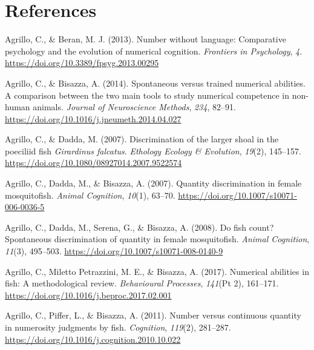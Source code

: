 \documentclass[
  ,pub,floatsintext]{apa6}
\newlength{\cslhangindent}
\newlength{\cslentryspacingunit} %
\newenvironment{CSLReferences}[2] %
 {%
  \setlength{\parindent}{0pt}
  \ifodd #1
  \let\oldpar\par
  \def\par{\hangindent=\cslhangindent\oldpar}
  \fi
  \setlength{\parskip}{#2\cslentryspacingunit}
 }%
 {}
\begin{document}
\hypertarget{references}{%
\section{References}\label{references}}

\scriptsize

\hypertarget{refs}{}
\begin{CSLReferences}{1}{0}
\leavevmode{}%
Agrillo, C., \& Beran, M. J. (2013). Number without language: Comparative psychology and the evolution of numerical cognition. \emph{Frontiers in Psychology}, \emph{4}. \url{https://doi.org/10.3389/fpsyg.2013.00295}

\leavevmode{}%
Agrillo, C., \& Bisazza, A. (2014). Spontaneous versus trained numerical abilities. {A} comparison between the two main tools to study numerical competence in non-human animals. \emph{Journal of Neuroscience Methods}, \emph{234}, 82--91. \url{https://doi.org/10.1016/j.jneumeth.2014.04.027}

\leavevmode{}%
Agrillo, C., \& Dadda, M. (2007). Discrimination of the larger shoal in the poeciliid fish \emph{{Girardinus} falcatus}. \emph{Ethology Ecology \& Evolution}, \emph{19}(2), 145--157. \url{https://doi.org/10.1080/08927014.2007.9522574}

\leavevmode{}%
Agrillo, C., Dadda, M., \& Bisazza, A. (2007). Quantity discrimination in female mosquitofish. \emph{Animal Cognition}, \emph{10}(1), 63--70. \url{https://doi.org/10.1007/s10071-006-0036-5}

\leavevmode{}%
Agrillo, C., Dadda, M., Serena, G., \& Bisazza, A. (2008). Do fish count? {Spontaneous} discrimination of quantity in female mosquitofish. \emph{Animal Cognition}, \emph{11}(3), 495--503. \url{https://doi.org/10.1007/s10071-008-0140-9}

\leavevmode{}%
Agrillo, C., Miletto Petrazzini, M. E., \& Bisazza, A. (2017). Numerical abilities in fish: {A} methodological review. \emph{Behavioural Processes}, \emph{141}(Pt 2), 161--171. \url{https://doi.org/10.1016/j.beproc.2017.02.001}

\leavevmode{}%
Agrillo, C., Piffer, L., \& Bisazza, A. (2011). Number versus continuous quantity in numerosity judgments by fish. \emph{Cognition}, \emph{119}(2), 281--287. \url{https://doi.org/10.1016/j.cognition.2010.10.022}


\end{CSLReferences}
\end{document}
